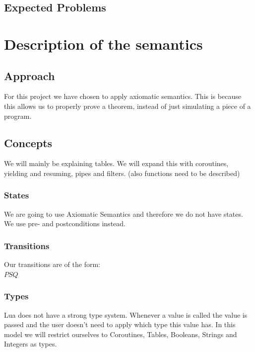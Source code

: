 \documentclass{article}
\begin{document}
\subsection{Expected Problems}

\section{Description of the semantics}
\subsection{Approach}
For this project we have chosen to apply axiomatic semantics. This is because this allows us to properly prove a theorem, instead of just simulating a piece of a program.
\subsection{Concepts}
We will mainly be explaining tables. We will expand this with coroutines, yielding and resuming, pipes and filters. (also functions need to be described)
\subsubsection{States}
We are going to use Axiomatic Semantics and therefore we do not have states. We use pre- and postconditions instead.
\subsubsection{Transitions}
Our transitions are of the form:\\
${P}S{Q}$\\
\subsubsection{Types}
Lua does not have a strong type system. Whenever a value is called the value is passed and the user doesn't need to apply which type this value has. In this model we will restrict ourselves to Coroutines, Tables, Booleans, Strings and Integers as types.
\end{document}
